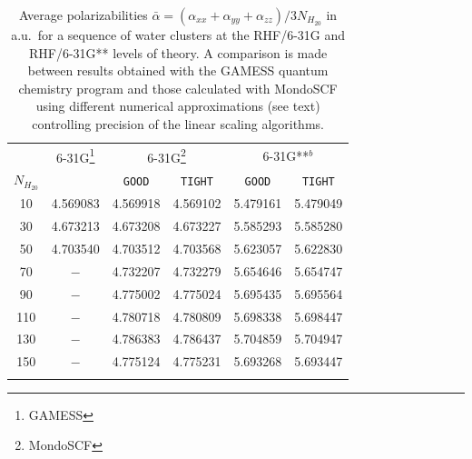 \documentclass[prl,aps,twocolumn,showpacs,twocolumngrid,superbib]{revtex4}
\newcommand{\commentoutA}[1]{#1}
\begin{document}
\commentoutA{
\begin{table}[t]
\caption{\protect Average polarizabilities $\bar{\alpha}=(\alpha_{xx}+\alpha_{yy}+\alpha_{zz})/3N_{H_20}$
         in a.u.~for a sequence of water clusters at the RHF/6-31G and RHF/6-31G** levels of theory.
         A comparison is made between results obtained with the {\sc GAMESS} quantum chemistry program
         \cite{gamess} and those calculated with {\sc MondoSCF} using different numerical approximations
         (see text) controlling precision of the linear scaling algorithms.}\label{tab:Polari_Values}
\begin{tabular}{cccccc}
\toprule 
      &\multicolumn{1}{c}{6-31G\footnote[1]{\sc GAMESS}}
      &\multicolumn{2}{c}{6-31G\footnote[2]{{\sc MondoSCF}}}
      &\multicolumn{2}{c}{6-31G**$^b$}\\
      $N_{H_20}$ &          & {\tt GOOD}     & {\tt TIGHT}    &  {\tt GOOD}    & {\tt TIGHT}   \\
      \hline
      10  & 4.569083 & 4.569918 & 4.569102 & 5.479161 & 5.479049  \\
      30  & 4.673213 & 4.673208 & 4.673227 & 5.585293 & 5.585280  \\
      50  & 4.703540 & 4.703512 & 4.703568 & 5.623057 & 5.622830  \\
      70  & $-$      & 4.732207 & 4.732279 & 5.654646 & 5.654747  \\
      90  & $-$      & 4.775002 & 4.775024 & 5.695435 & 5.695564  \\
      110 & $-$      & 4.780718 & 4.780809 & 5.698338 & 5.698447  \\
      130 & $-$      & 4.786383 & 4.786437 & 5.704859 & 5.704947  \\
      150 & $-$      & 4.775124 & 4.775231 & 5.693268 & 5.693447  \\
\botrule
\end{tabular}
\end{table}

}
\end{document}
